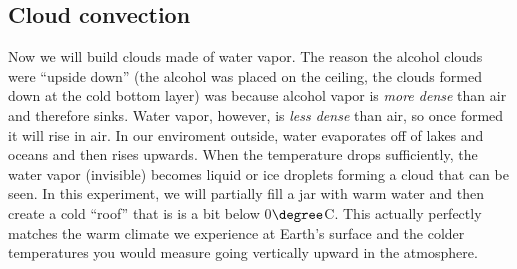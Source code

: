 \answerspace[7cm]

\subsection{Cloud convection}

Now we will build clouds made of water vapor.  The reason the alcohol clouds were ``upside down'' (the alcohol was placed on the ceiling, the clouds formed down at the cold bottom layer) was because alcohol vapor is {\em more dense} than air and therefore sinks.  Water vapor, however, is {\em less dense} than air, so once formed it will rise in air. In our enviroment outside, water evaporates off of  lakes and oceans and then rises upwards.  When the temperature drops sufficiently, the water vapor (invisible) becomes liquid or ice droplets forming a cloud that can be seen.  In this experiment, we will partially fill a jar with warm water and then create a cold ``roof'' that is is a bit below 0$\degree$C. This actually perfectly matches the warm climate we experience at Earth's surface and the colder temperatures you would measure going vertically upward in the atmosphere.\\[-6pt]


